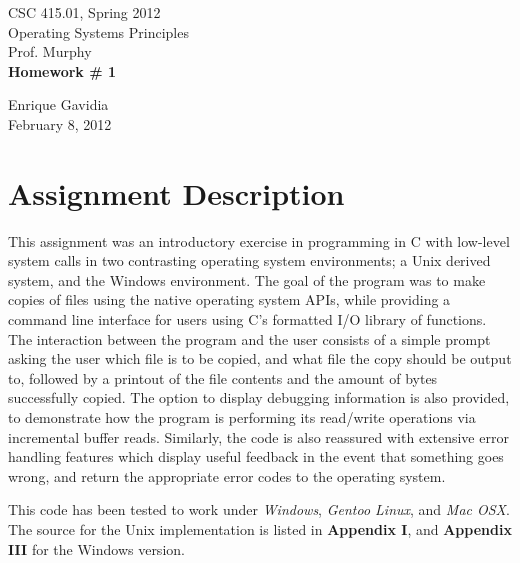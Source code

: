 \documentclass[12pt]{article}
\def \name       {Enrique Gavidia}
\def \coursenum  {CSC 415.01}
\def \coursename {Operating Systems Principles}
\def \instructor {Prof. Murphy}
\def \semester   {Spring 2012}
\def \assignment {Homework \# 1}
\def \duedate    {February 8, 2012}
\begin{document}
\begin{titlepage}
  \begin{center}

    {\LARGE \coursenum, \semester \\ \coursename}\\
    {\Large \instructor}\\

    \vfill
    \textbf{\Huge \assignment}\\
    \vfill
    
    {\Large \name}\\ 
    {\large \duedate}
    
  \end{center}
\end{titlepage}


\section*{Assignment Description}
This assignment was an introductory exercise in programming in C with low-level system calls in two contrasting operating 
system environments; a Unix derived system, and the Windows environment. The goal of the program was to make copies of files 
using the native operating system APIs, while providing a command line interface for users using C's formatted I/O library of
functions.  The interaction between the program and the user consists of a simple prompt asking the user which file is to be copied,
and what file the copy should be output to, followed by a printout of the file contents and the amount of bytes successfully copied.
The option to display debugging information is also provided, to demonstrate how the program is performing its read/write operations
via incremental buffer reads.  Similarly, the code is also reassured with extensive error handling features which display useful feedback
in the event that something goes wrong, and return the appropriate error codes to the operating system.

This code has been tested to work under \textsl{Windows}, \textsl{Gentoo Linux}, and \textsl{Mac OSX}. 
The source for the Unix implementation is listed in \textbf{Appendix I}, and \textbf{Appendix III} for the Windows version.
\end{document}
